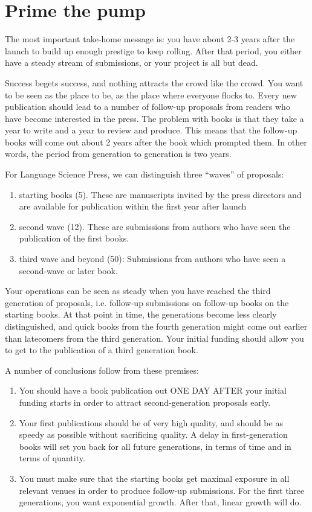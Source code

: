 \documentclass[output=guidelines,guidelines] {langscibook}
\begin{document}
\chapter{Prime the pump}

The most important take-home message is: you have about 2-3 years after the launch to build up enough prestige to keep rolling. 
After that period, you either have a steady stream of submissions, or your project is all but dead. 

Success begets success, and nothing attracts the crowd like the crowd. You want to be seen as the place to be, as the place where everyone flocks to. Every new publication should lead to a number of follow-up proposals from readers who have become interested in the press. The problem with books is that they take a year to write and a year to review and produce. This means that the follow-up books will come out about 2 years after the book which prompted them. In other words, the period from generation to generation is two years. 

For Language Science Press, we can distinguish three ``waves'' of proposals: 

\begin{enumerate}
 \item starting books (5). These are manuscripts invited by the press directors and are available for publication within the first year after launch
 \item second wave (12). These are submissions from authors who have seen the publication of the first books.
 \item third wave and beyond (50): Submissions from authors who have seen a second-wave or later book. 
\end{enumerate}

Your operations can be seen as steady when you have reached the third generation of proposals, i.e. follow-up submissions on follow-up books on the starting books. At that point in time, the generations become less clearly distinguished, and quick books from the fourth generation might come out earlier than latecomers from the third generation. Your initial funding should allow you to get to the publication of a third generation book.

A number of conclusions follow from these premises:

\begin{enumerate}
 \item You should have a book publication out ONE DAY AFTER your initial funding starts in order to attract second-generation proposals early. 
 \item Your first publications should be of very high quality, and should be as speedy as possible without sacrificing quality. A delay in first-generation books will set you back for all future generations, in terms of time and in terms of quantity.
 \item You must make sure that the starting books get maximal exposure in all relevant venues in order to produce follow-up submissions. For the first three generations, you want exponential growth. After that, linear growth will do. 
\end{enumerate}
\end{document}
